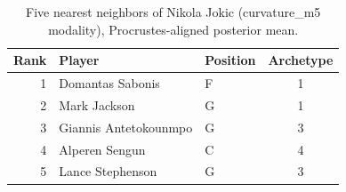 \begin{table}[htbp]
  \centering\small
  \begin{tabular}{rllc}
    \toprule
    Rank & Player & Position & Archetype \\
    \midrule
    1 & Domantas Sabonis & F & 1 \\
    2 & Mark Jackson & G & 1 \\
    3 & Giannis Antetokounmpo & G & 3 \\
    4 & Alperen Sengun & C & 4 \\
    5 & Lance Stephenson & G & 3 \\
    \bottomrule
  \end{tabular}
  \caption{Five nearest neighbors of Nikola Jokic (curvature_m5 modality), Procrustes-aligned posterior mean.}
  \label{tab:Nikola_Jokic_neighbors_curvature_m5}
\end{table}

